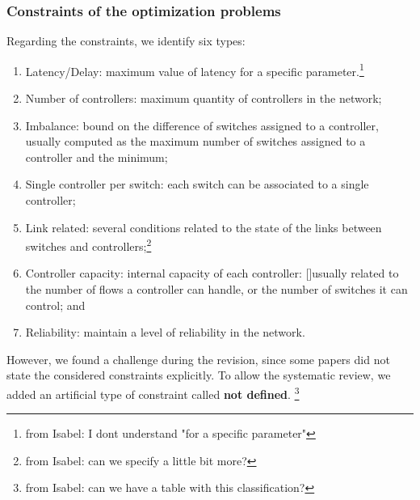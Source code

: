 \documentclass{IEEEtran}
\newcommand\fia[1]{{\color{red}\footnote{\color{red}from Isabel: #1}}} %
\newcommand\mia[1]{{\color{red}#1}}%
\begin{document}
\subsubsection{Constraints of the optimization problems}
Regarding the constraints, we identify six types: 
\begin{enumerate}
    \item Latency/Delay: maximum value of latency for a specific parameter.\fia{I dont understand "for a specific parameter"}
    \item Number of controllers: maximum quantity of controllers in the network;
    \item Imbalance: bound on the difference of switches assigned to a controller, usually computed as the maximum number of switches assigned to a controller and the minimum;
    \item Single controller per switch: each switch can be associated to a single controller;
    \item Link related: several conditions related to the state of the links between switches and controllers;\fia{can we specify a little bit more?}
    \item Controller capacity: internal capacity of each controller: \mia[]{usually related to the number of flows a controller can handle, or the number of switches it can control}; and
    \item Reliability: maintain a level of reliability in the network.
\end{enumerate}
However, we found a challenge during the revision, since some papers did not state the considered constraints explicitly. To allow the systematic review, we added an artificial type of constraint called \textbf{not defined}. \fia{can we have a table with this classification?}
\end{document}
